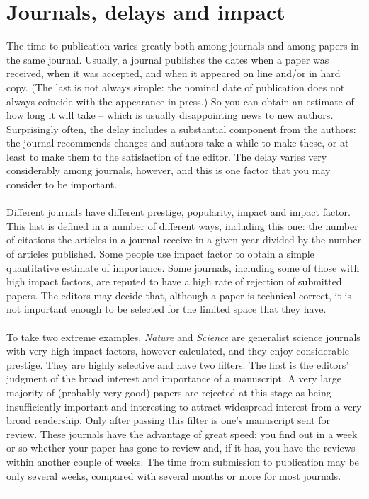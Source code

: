 \documentclass[a4paper,12pt]{article}
\begin{document}
\section{Journals, delays and impact}
The time to publication varies greatly both among journals and among papers in the same journal. Usually, a journal publishes the dates when a paper was received, when it was accepted, and when it appeared on line and/or in hard copy. (The last is not always simple: the nominal date of publication does not always coincide with the appearance in press.) So you can obtain an estimate of how long it will take – which is usually disappointing news to new authors. Surprisingly often, the delay includes a substantial component from the authors: the journal recommends changes and authors take a while to make these, or at least to make them to the satisfaction of the editor. The delay varies very considerably among journals, however, and this is one factor that you may consider to be important.\\\\Different journals have different prestige, popularity, impact and impact factor. This last is defined in a number of different ways, including this one: the number of citations the articles in a journal receive in a given year divided by the number of articles published. Some people use impact factor to obtain a simple quantitative estimate of importance. Some journals, including some of those with high impact factors, are reputed to have a high rate of rejection of submitted papers. The editors may decide that, although a paper is technical correct, it is not important enough to be selected for the limited space that they have.\\\\To take two extreme examples, \textit{Nature} and \textit{Science} are generalist science journals with very high impact factors, however calculated, and they enjoy considerable prestige. They are highly selective and have two filters. The first is the editors’ judgment of the broad interest and importance of a manuscript. A very large majority of (probably very good) papers are rejected at this stage as being insufficiently important and interesting to attract widespread interest from a very broad readership. Only after passing this filter is one’s manuscript sent for review. These journals have the advantage of great speed: you find out in a week or so whether your paper has gone to review and, if it has, you have the reviews within another couple of weeks. The time from submission to publication may be only several weeks, compared with several months or more for most journals. 
\noindent\rule{\textwidth}{1pt}
\end{document}
